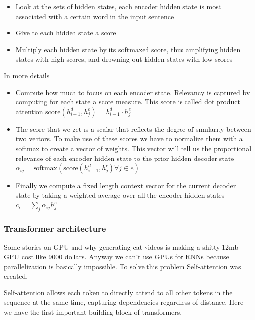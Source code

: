 \begin{itemize}
    \item Look at the sets of hidden states, each encoder hidden state is most associated with a certain word in the input sentence
    \item Give to each hidden state a score
    \item Multiply each hidden state by its softmaxed score, thus amplifying hidden states with high scores, and drowning out hidden states with low scores
\end{itemize}


In more details

\begin{itemize}
    \item Compute how much to focus on each encoder state. Relevancy is captured by computing for each state a score measure. This score is called dot product attention $\text{score} (h_{i-1}^d, h_j^e ) = h_{i-1}^d \cdot h_j^e$ 
    \item The score that we get is a scalar that reflects the degree of similarity between two vectors. To make use of these scores we have to normalize them with a softmax to create a vector of weights. This vector will tell us the proportional relevance of each encoder hidden state to the prior hidden decoder state $\alpha_{ij} = \text{softmax} ( \text{score}(h_{i-1}^d, h_{j}^e) \forall j \in e)$
    \item Finally we compute a fixed length context vector for the current decoder state by taking a weighted average over all the encoder hidden states $c_i = \sum_{j}\alpha_{ij} h_{j}^e$
\end{itemize}


\subsubsection{Transformer architecture}

Some stories on GPU and why generating cat videos is making a shitty 12mb GPU cost like 9000 dollars. Anyway we can't use GPUs for RNNs because parallelization is basically impossible. To solve this problem Self-attention was created.

\vspace{10pt}

Self-attention allows each token to directly attend to all other tokens in the
sequence at the same time, capturing dependencies regardless of distance. Here we have the first important building block of transformers. 

